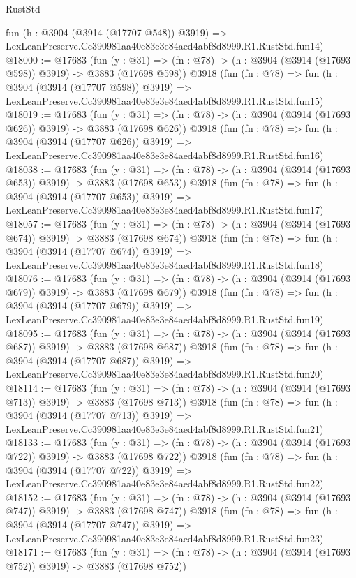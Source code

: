 \begin{lexlean}{RustStd}
\begin{coremodule}
    fun (h : @3904 (@3914 (@17707 @548)) @3919) =>
    LexLeanPreserve.Cc390981aa40e83e3e84aed4abf8d8999.R1.RustStd.fun14)
@18000 := @17683
    (fun (y : @31) => (fn : @78) -> (h : @3904 (@3914 (@17693 @598)) @3919) -> @3883 (@17698 @598))
    @3918
    (fun (fn : @78) =>
    fun (h : @3904 (@3914 (@17707 @598)) @3919) =>
    LexLeanPreserve.Cc390981aa40e83e3e84aed4abf8d8999.R1.RustStd.fun15)
@18019 := @17683
    (fun (y : @31) => (fn : @78) -> (h : @3904 (@3914 (@17693 @626)) @3919) -> @3883 (@17698 @626))
    @3918
    (fun (fn : @78) =>
    fun (h : @3904 (@3914 (@17707 @626)) @3919) =>
    LexLeanPreserve.Cc390981aa40e83e3e84aed4abf8d8999.R1.RustStd.fun16)
@18038 := @17683
    (fun (y : @31) => (fn : @78) -> (h : @3904 (@3914 (@17693 @653)) @3919) -> @3883 (@17698 @653))
    @3918
    (fun (fn : @78) =>
    fun (h : @3904 (@3914 (@17707 @653)) @3919) =>
    LexLeanPreserve.Cc390981aa40e83e3e84aed4abf8d8999.R1.RustStd.fun17)
@18057 := @17683
    (fun (y : @31) => (fn : @78) -> (h : @3904 (@3914 (@17693 @674)) @3919) -> @3883 (@17698 @674))
    @3918
    (fun (fn : @78) =>
    fun (h : @3904 (@3914 (@17707 @674)) @3919) =>
    LexLeanPreserve.Cc390981aa40e83e3e84aed4abf8d8999.R1.RustStd.fun18)
@18076 := @17683
    (fun (y : @31) => (fn : @78) -> (h : @3904 (@3914 (@17693 @679)) @3919) -> @3883 (@17698 @679))
    @3918
    (fun (fn : @78) =>
    fun (h : @3904 (@3914 (@17707 @679)) @3919) =>
    LexLeanPreserve.Cc390981aa40e83e3e84aed4abf8d8999.R1.RustStd.fun19)
@18095 := @17683
    (fun (y : @31) => (fn : @78) -> (h : @3904 (@3914 (@17693 @687)) @3919) -> @3883 (@17698 @687))
    @3918
    (fun (fn : @78) =>
    fun (h : @3904 (@3914 (@17707 @687)) @3919) =>
    LexLeanPreserve.Cc390981aa40e83e3e84aed4abf8d8999.R1.RustStd.fun20)
@18114 := @17683
    (fun (y : @31) => (fn : @78) -> (h : @3904 (@3914 (@17693 @713)) @3919) -> @3883 (@17698 @713))
    @3918
    (fun (fn : @78) =>
    fun (h : @3904 (@3914 (@17707 @713)) @3919) =>
    LexLeanPreserve.Cc390981aa40e83e3e84aed4abf8d8999.R1.RustStd.fun21)
@18133 := @17683
    (fun (y : @31) => (fn : @78) -> (h : @3904 (@3914 (@17693 @722)) @3919) -> @3883 (@17698 @722))
    @3918
    (fun (fn : @78) =>
    fun (h : @3904 (@3914 (@17707 @722)) @3919) =>
    LexLeanPreserve.Cc390981aa40e83e3e84aed4abf8d8999.R1.RustStd.fun22)
@18152 := @17683
    (fun (y : @31) => (fn : @78) -> (h : @3904 (@3914 (@17693 @747)) @3919) -> @3883 (@17698 @747))
    @3918
    (fun (fn : @78) =>
    fun (h : @3904 (@3914 (@17707 @747)) @3919) =>
    LexLeanPreserve.Cc390981aa40e83e3e84aed4abf8d8999.R1.RustStd.fun23)
@18171 := @17683
    (fun (y : @31) => (fn : @78) -> (h : @3904 (@3914 (@17693 @752)) @3919) -> @3883 (@17698 @752))

\end{coremodule}
\end{lexlean}

